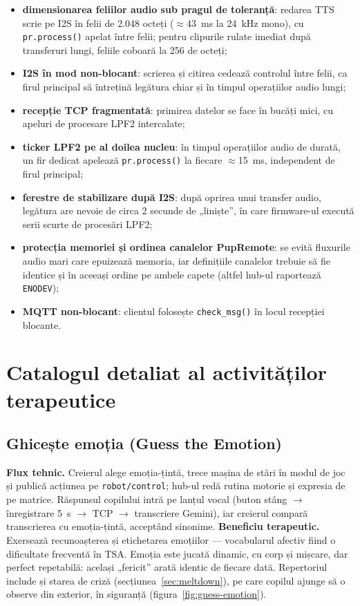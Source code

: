 \begin{itemize}
    \item \textbf{dimensionarea feliilor audio sub pragul de toleranță}: redarea TTS scrie pe I2S în felii de 2.048 octeți ($\approx$43~ms la 24~kHz mono), cu \texttt{pr.process()} apelat între felii; pentru clipurile rulate imediat după transferuri lungi, feliile coboară la 256 de octeți;
    \item \textbf{I2S în mod non-blocant}: scrierea și citirea cedează controlul între felii, ca firul principal să întrețină legătura chiar și în timpul operațiilor audio lungi;
    \item \textbf{recepție TCP fragmentată}: primirea datelor se face în bucăți mici, cu apeluri de procesare LPF2 intercalate;
    \item \textbf{ticker LPF2 pe al doilea nucleu}: în timpul operațiilor audio de durată, un fir dedicat apelează \texttt{pr.process()} la fiecare $\approx$15~ms, independent de firul principal;
    \item \textbf{ferestre de stabilizare după I2S}: după oprirea unui transfer audio, legătura are nevoie de circa 2 secunde de „liniște”, în care firmware-ul execută serii scurte de procesări LPF2;
    \item \textbf{protecția memoriei și ordinea canalelor PupRemote}: se evită fluxurile audio mari care epuizează memoria, iar definițiile canalelor trebuie să fie identice și în aceeași ordine pe ambele capete (altfel hub-ul raportează \texttt{ENODEV});
    \item \textbf{MQTT non-blocant}: clientul folosește \texttt{check\_msg()} în locul recepției blocante.
\end{itemize}

\section{Catalogul detaliat al activităților terapeutice}

\subsection*{Ghicește emoția (Guess the Emotion)}
\textbf{Flux tehnic.} Creierul alege emoția-țintă, trece mașina de stări în modul de joc și publică acțiunea pe \texttt{robot/control}; hub-ul redă rutina motorie și expresia de pe matrice. Răspunsul copilului intră pe lanțul vocal (buton stâng $\rightarrow$ înregistrare 5~s $\rightarrow$ TCP $\rightarrow$ transcriere Gemini), iar creierul compară transcrierea cu emoția-țintă, acceptând sinonime.
\textbf{Beneficiu terapeutic.} Exersează recunoașterea și etichetarea emoțiilor — vocabularul afectiv fiind o dificultate frecventă în TSA. Emoția este jucată dinamic, cu corp și mișcare, dar perfect repetabilă: același „fericit” arată identic de fiecare dată. Repertoriul include și starea de criză (secțiunea~\ref{sec:meltdown}), pe care copilul ajunge să o observe din exterior, în siguranță (figura~\ref{fig:guess-emotion}).

